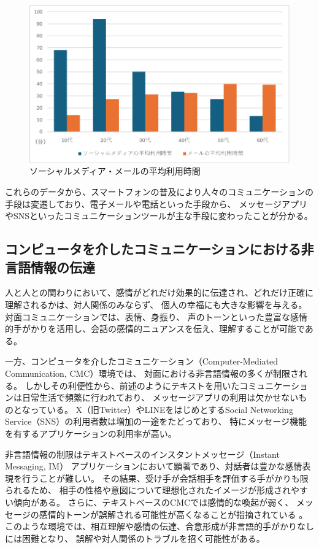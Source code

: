 \documentclass[11pt,a4paper]{ltjsreport}
\begin{document}
\begin{figure}[htbp]
    \begin{center}
        \includegraphics[width=120mm]{PDF/graph_2.pdf}
        \caption{ソーシャルメディア・メールの平均利用時間}
        \label{figure:graph2}
    \end{center}
\end{figure}

これらのデータから、スマートフォンの普及により人々のコミュニケーションの手段は変遷しており、電子メールや電話といった手段から、
メッセージアプリやSNSといったコミュニケーションツールが主な手段に変わったことが分かる。

\subsection{コンピュータを介したコミュニケーションにおける非言語情報の伝達}
人と人との関わりにおいて、感情がどれだけ効果的に伝達され、どれだけ正確に理解されるかは、対人関係のみならず、
個人の幸福にも大きな影響を与える\cite{book_Susan}。対面コミュニケーションでは、表情、身振り、
声のトーンといった豊富な感情的手がかりを活用し、会話の感情的ニュアンスを伝え、理解することが可能である。

一方、コンピュータを介したコミュニケーション（Computer-Mediated Communication, CMC）環境では、
対面における非言語情報の多くが制限される。
しかしその利便性から、前述のようにテキストを用いたコミュニケーションは日常生活で頻繁に行われており、
メッセージアプリの利用は欠かせないものとなっている。
X（旧Twitter）やLINEをはじめとするSocial Networking Service（SNS）の利用者数は増加の一途をたどっており、
特にメッセージ機能を有するアプリケーションの利用率が高い\cite{Web1}。

非言語情報の制限はテキストベースのインスタントメッセージ（Instant Messaging, IM）
アプリケーションにおいて顕著であり、対話者は豊かな感情表現を行うことが難しい\cite{Thesis_Joseph}。
その結果、受け手が会話相手を評価する手がかりも限られるため、
相手の性格や意図について理想化されたイメージが形成されやすい傾向がある\cite{Thesis_Joseph2}。
さらに、テキストベースのCMCでは感情的な喚起が弱く、
メッセージの感情的トーンが誤解される可能性が高くなることが指摘されている \cite{Thesis_Joseph}。
このような環境では、相互理解や感情の伝達、合意形成が非言語的手がかりなしには困難となり、
誤解や対人関係のトラブルを招く可能性がある\cite{Thesis_Morimoto}。
\end{document}
